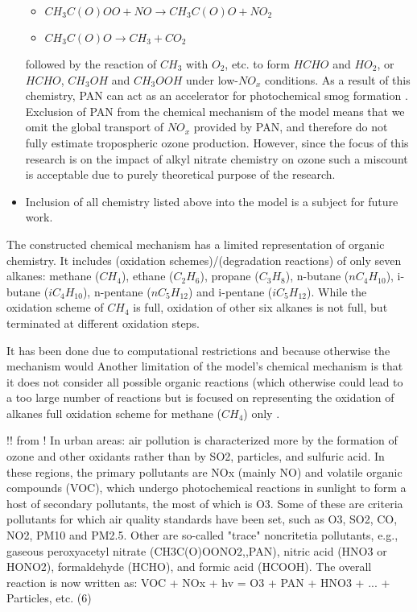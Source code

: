 \documentclass[11pt,a4paper]{article}
\begin{document}
\begin{itemize}
\begin{itemize}
\item[] $CH_3C(O)OO + NO \rightarrow CH_3C(O)O + NO_2$
\item[] $CH_3C(O)O \rightarrow CH_3 + CO_2$
\end{itemize}
followed by the reaction of $CH_3$ with $O_2$, etc. to form $HCHO$ and $HO_2$, or $HCHO$, $CH_3OH$ and $CH_3OOH$ under low-$NO_x$ conditions. As a result of this chemistry, PAN can act as an accelerator for photochemical smog formation \citep{Finlayson-Pitts2000}. Exclusion of PAN from the chemical mechanism of the model means that we omit the global transport of $NO_x$ provided by PAN, and therefore do not fully estimate tropospheric ozone production. However, since the focus of this research is on the impact of alkyl nitrate chemistry on ozone such a miscount is acceptable due to purely theoretical purpose of the research.
\item Inclusion of all chemistry listed above into the model is a subject for future work.
\end{itemize}

The constructed chemical mechanism has a limited representation of organic chemistry. It includes (oxidation schemes)/(degradation reactions) of only seven alkanes: methane ($CH_4$), ethane ($C_2H_6$), propane ($C_3H_8$), n-butane ($nC_4H_{10}$), i-butane ($iC_4H_{10}$), n-pentane ($nC_5H_{12}$) and i-pentane ($iC_5H_{12}$). While the oxidation scheme of $CH_4$ is full, oxidation of other six alkanes is not full, but terminated at different oxidation steps.


It has been done due to computational restrictions and  because otherwise the mechanism would 
Another limitation of the model's chemical mechanism is that it does not consider all possible organic reactions (which otherwise could lead to a too large number of reactions but is focused on representing the oxidation of alkanes
full oxidation scheme for methane ($CH_4$) only .

!! from \citep{Finlayson-Pitts2000}
! In urban areas: air pollution is characterized more by the formation of ozone and other oxidants rather than by SO2, particles, and sulfuric acid. In these regions, the primary pollutants are NOx (mainly NO) and volatile organic compounds (VOC), which undergo photochemical reactions in sunlight to form a host of secondary pollutants, the most of which is O3. Some of these are criteria pollutants for which air quality standards have been set, such as O3, SO2, CO, NO2, PM10 and PM2.5. Other are so-called "trace" noncritetia pollutants, e.g., gaseous peroxyacetyl nitrate (CH3C(O)OONO2,,PAN), nitric acid (HNO3 or HONO2), formaldehyde (HCHO), and formic acid (HCOOH). The overall reaction is now written as:
VOC + NOx + hv = O3 + PAN + HNO3 + ... + Particles, etc. (6)
\end{document}

